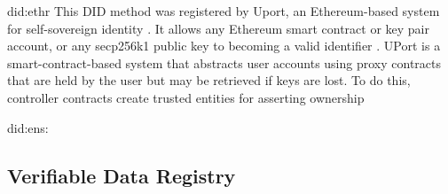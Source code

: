 did:ethr
This DID method was registered by Uport, an Ethereum-based system for self-sovereign identity \cite{Lundkvist_Heck_Torstensson_Mitton_Sena_2016}. It allows any Ethereum smart contract or key pair account, or any secp256k1 public key to becoming a valid identifier \cite{nistor_grassberger_carlin_2022}. UPort is a smart-contract-based system that abstracts user accounts using proxy contracts that are held by the user but may be retrieved if keys are lost. To do this, controller contracts create trusted entities for asserting ownership \cite{8783188}


did:ens:




\subsection{Verifiable Data Registry}

